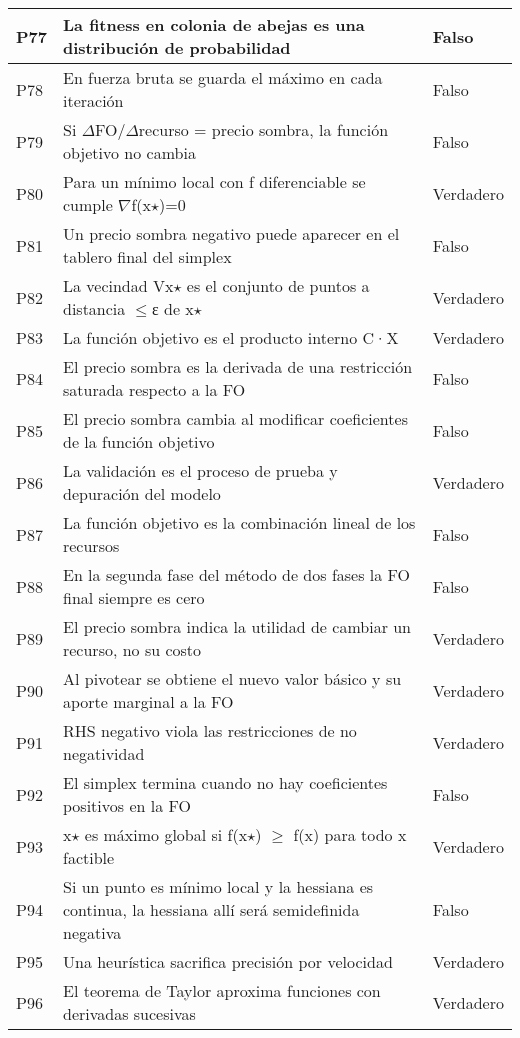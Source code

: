 \documentclass{article}
\begin{document}
\begin{longtable}{|p{1.5cm}|p{14cm}|p{2cm}|}
P77 & La fitness en colonia de abejas es una distribución de probabilidad & Falso \\ \hline
P78 & En fuerza bruta se guarda el máximo en cada iteración & Falso \\ \hline
P79 & Si $\Delta$FO/$\Delta$recurso = precio sombra, la función objetivo no cambia & Falso \\ \hline
P80 & Para un mínimo local con f diferenciable se cumple $\nabla$f(x$\star$)=0 & Verdadero \\ \hline
P81 & Un precio sombra negativo puede aparecer en el tablero final del simplex & Falso \\ \hline
P82 & La vecindad Vx$\star$ es el conjunto de puntos a distancia $\leq$ε de x$\star$ & Verdadero \\ \hline
P83 & La función objetivo es el producto interno C·X & Verdadero \\ \hline
P84 & El precio sombra es la derivada de una restricción saturada respecto a la FO & Falso \\ \hline
P85 & El precio sombra cambia al modificar coeficientes de la función objetivo & Falso \\ \hline
P86 & La validación es el proceso de prueba y depuración del modelo & Verdadero \\ \hline
P87 & La función objetivo es la combinación lineal de los recursos & Falso \\ \hline
P88 & En la segunda fase del método de dos fases la FO final siempre es cero & Falso \\ \hline
P89 & El precio sombra indica la utilidad de cambiar un recurso, no su costo & Verdadero \\ \hline
P90 & Al pivotear se obtiene el nuevo valor básico y su aporte marginal a la FO & Verdadero \\ \hline
P91 & RHS negativo viola las restricciones de no negatividad & Verdadero \\ \hline
P92 & El simplex termina cuando no hay coeficientes positivos en la FO & Falso \\ \hline
P93 & x$\star$ es máximo global si f(x$\star$) $\geq$ f(x) para todo x factible & Verdadero \\ \hline
P94 & Si un punto es mínimo local y la hessiana es continua, la hessiana allí será semidefinida negativa & Falso \\ \hline
P95 & Una heurística sacrifica precisión por velocidad & Verdadero \\ \hline
P96 & El teorema de Taylor aproxima funciones con derivadas sucesivas & Verdadero \\ \hline

\end{longtable}
\end{document}

